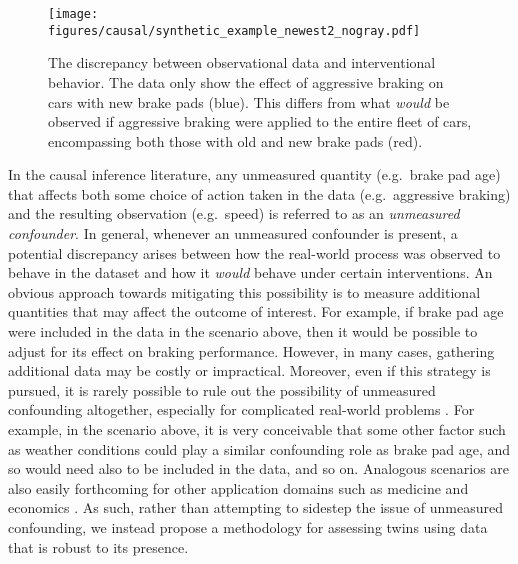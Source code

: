 \begin{figure}
    \centering
    \texttt{[image: figures/causal/synthetic\_example\_newest2\_nogray.pdf]}

    \caption{The discrepancy between observational data and interventional behavior. The data only show the effect of aggressive braking on cars with new brake pads (blue). This differs from what \emph{would} be observed if aggressive braking were applied to the entire fleet of cars, encompassing both those with old and new brake pads (red).}
    
    \label{fig:syn_ex}
\end{figure}

In the causal inference literature, any unmeasured quantity (e.g.\ brake pad age) that affects both some choice of action taken in the data (e.g.\ aggressive braking) and the resulting observation (e.g.\ speed) is referred to as an \emph{unmeasured confounder}.
In general, whenever an unmeasured confounder is present, a potential discrepancy arises between how the real-world process was observed to behave in the dataset and how it \emph{would} behave under certain interventions.
An obvious approach towards mitigating this possibility is to measure additional quantities that may affect the outcome of interest.
For example, if brake pad age were included in the data in the scenario above, then it would be possible to adjust for its effect on braking performance. 
However, in many cases, gathering additional data may be costly or impractical.
Moreover, even if this strategy is pursued, it is rarely possible to rule out the possibility of unmeasured confounding altogether, especially for complicated real-world problems \citep{tsiatis2019dynamic}. 
For example, in the scenario above, it is very conceivable that some other factor such as weather conditions could play a similar confounding role as brake pad age, and so would need also to be included in the data, and so on.
Analogous scenarios are also easily forthcoming for other application domains such as medicine and economics \citep{manski1995identification,tsiatis2019dynamic,hernan2020causal}.
%
As such, rather than attempting to sidestep the issue of unmeasured confounding, we instead propose a methodology for assessing twins using data that is robust to its presence. %

%
%
%
%
%


